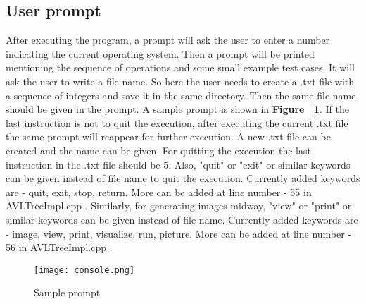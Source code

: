 \documentclass{article}
\begin{document}
\subsection{User prompt}
After executing the program, a prompt will ask the user to enter a number indicating the current operating system. Then a prompt will be printed mentioning the sequence of operations and some small example test cases. It will ask the user to write a file name. So here the user needs to create a .txt file with a sequence of integers and save it in the same directory. Then the same file name should be given in the prompt. A sample prompt is shown in \textbf{Figure ~\ref{fig:ex1}}. If the last instruction is not to quit the execution, after executing the current .txt file the same prompt will reappear for further execution. A new .txt file can be created and the name can be given. For quitting the execution the last instruction in the .txt file should be $5$. Also, "quit" or "exit" or similar keywords can be given instead of file name to quit the execution. Currently added keywords are - quit, exit, stop, return. More can be added at line number - 55 in AVLTreeImpl.cpp . Similarly, for generating images midway, "view" or "print" or similar keywords can be given instead of file name. Currently added keywords are - image, view, print, visualize, run, picture. More can be added at line number - 56 in AVLTreeImpl.cpp .
\begin{figure}
\texttt{[image: console.png]}
\caption{Sample prompt}
\label{fig:ex1}
\end{figure}
\end{document}
